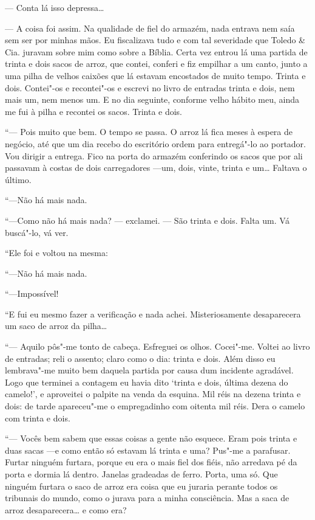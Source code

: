 --- Conta lá isso depressa\ldots{}

--- A coisa foi assim. Na qualidade de fiel do armazém, nada entrava nem
saía sem ser por minhas mãos. Eu fiscalizava tudo e com tal severidade
que Toledo \& Cia. juravam sobre mim como sobre a Bíblia. Certa vez
entrou lá uma partida de trinta e dois sacos de arroz, que contei,
conferi e fiz empilhar a um canto, junto a uma pilha de velhos caixões
que lá estavam encostados de muito tempo. Trinta e dois. Contei"-os e
recontei"-os e escrevi no livro de entradas trinta e dois, nem mais um,
nem menos um. E no dia seguinte, conforme velho hábito meu, ainda me fui
à pilha e recontei os sacos. Trinta e dois.

``--- Pois muito que bem. O tempo se passa. O arroz lá fica meses à
espera de negócio, até que um dia recebo do escritório ordem para
entregá"-lo ao portador. Vou dirigir a entrega. Fico na porta do armazém
conferindo os sacos que por ali passavam à costas de dois carregadores
---um, dois, vinte, trinta e um\ldots{} Faltava o último.


``---Não há mais nada.

``---Como não há mais nada? --- exclamei. --- São trinta e dois. Falta
um. Vá buscá"-lo, vá ver.

``Ele foi e voltou na mesma:

``---Não há mais nada.

``---Impossível!

``E fui eu mesmo fazer a verificação e nada achei. Misteriosamente
desaparecera um saco de arroz da pilha\ldots{}

``--- Aquilo pôs"-me tonto de cabeça. Esfreguei os olhos. Cocei"-me.
Voltei ao livro de entradas; reli o assento; claro como o dia: trinta e
dois. Além disso eu lembrava"-me muito bem daquela partida por causa dum
incidente agradável. Logo que terminei a contagem eu havia dito `trinta
e dois, última dezena do camelo!', e aproveitei o palpite na venda da
esquina. Mil réis na dezena trinta e dois: de tarde apareceu"-me o
empregadinho com oitenta mil réis. Dera o camelo com trinta e dois.

``--- Vocês bem sabem que essas coisas a gente não esquece. Eram pois
trinta e duas sacas ---e como então só estavam lá trinta e uma? Pus"-me a
parafusar. Furtar ninguém furtara, porque eu era o mais fiel dos fiéis,
não arredava pé da porta e dormia lá dentro. Janelas gradeadas de ferro.
Porta, uma só. Que ninguém furtara o saco de arroz era coisa que eu
juraria perante todos os tribunais do mundo, como o jurava para a minha
consciência. Mas a saca de arroz desaparecera\ldots{} e como era?

